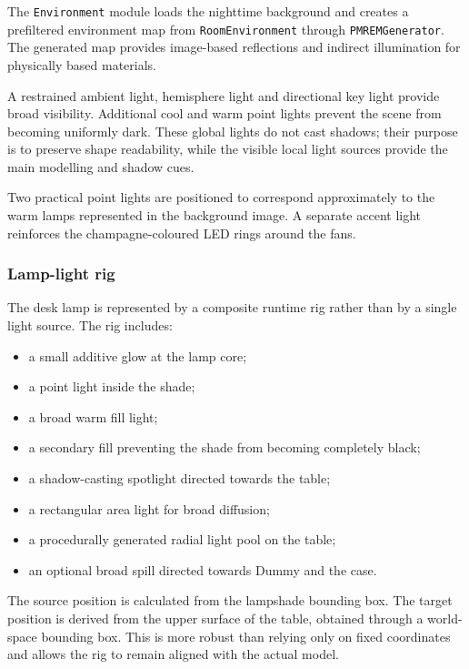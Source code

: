 \documentclass{report}
\begin{document}
The \texttt{Environment} module loads the nighttime background and
creates a prefiltered environment map from
\texttt{RoomEnvironment} through \texttt{PMREMGenerator}. The generated
map provides image-based reflections and indirect illumination for
physically based materials.

A restrained ambient light, hemisphere light and directional key light
provide broad visibility. Additional cool and warm point lights prevent
the scene from becoming uniformly dark. These global lights do not cast
shadows; their purpose is to preserve shape readability, while the
visible local light sources provide the main modelling and shadow cues.

Two practical point lights are positioned to correspond approximately
to the warm lamps represented in the background image. A separate
accent light reinforces the champagne-coloured LED rings around the
fans.

\subsubsection{Lamp-light rig}

The desk lamp is represented by a composite runtime rig rather than by a
single light source. The rig includes:

\begin{itemize}
    \item a small additive glow at the lamp core;
    \item a point light inside the shade;
    \item a broad warm fill light;
    \item a secondary fill preventing the shade from becoming completely black;
    \item a shadow-casting spotlight directed towards the table;
    \item a rectangular area light for broad diffusion;
    \item a procedurally generated radial light pool on the table;
    \item an optional broad spill directed towards Dummy and the case.
\end{itemize}

The source position is calculated from the lampshade bounding box. The
target position is derived from the upper surface of the table, obtained
through a world-space bounding box. This is more robust than relying
only on fixed coordinates and allows the rig to remain aligned with the
actual model.
\end{document}
